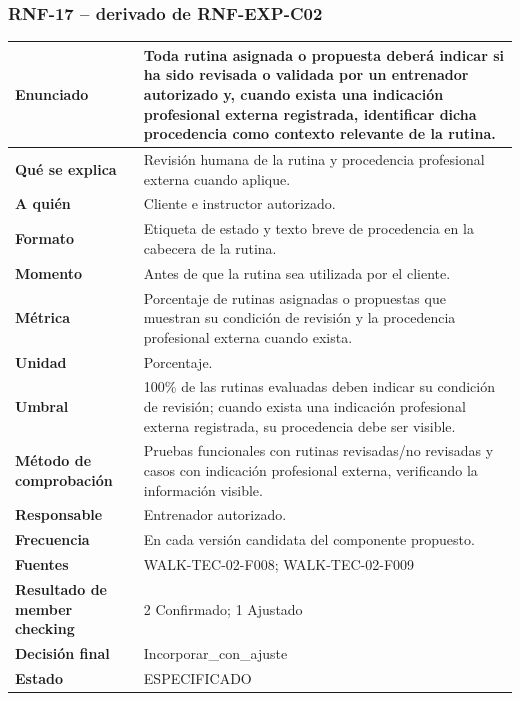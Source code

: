 \documentclass[11pt,a4paper,twoside]{article}
\begin{document}
\subsubsection{RNF-17 -- derivado de RNF-EXP-C02}
\begin{tabularx}{\textwidth}{|>{\bfseries}p{4.0cm}|X|}\hline
Enunciado & Toda rutina asignada o propuesta deberá indicar si ha sido revisada o validada por un entrenador autorizado y, cuando exista una indicación profesional externa registrada, identificar dicha procedencia como contexto relevante de la rutina. \\ \hline
Qué se explica & Revisión humana de la rutina y procedencia profesional externa cuando aplique. \\ \hline
A quién & Cliente e instructor autorizado. \\ \hline
Formato & Etiqueta de estado y texto breve de procedencia en la cabecera de la rutina. \\ \hline
Momento & Antes de que la rutina sea utilizada por el cliente. \\ \hline
Métrica & Porcentaje de rutinas asignadas o propuestas que muestran su condición de revisión y la procedencia profesional externa cuando exista. \\ \hline
Unidad & Porcentaje. \\ \hline
Umbral & 100\% de las rutinas evaluadas deben indicar su condición de revisión; cuando exista una indicación profesional externa registrada, su procedencia debe ser visible. \\ \hline
Método de comprobación & Pruebas funcionales con rutinas revisadas/no revisadas y casos con indicación profesional externa, verificando la información visible. \\ \hline
Responsable & Entrenador autorizado. \\ \hline
Frecuencia & En cada versión candidata del componente propuesto. \\ \hline
Fuentes & WALK-TEC-02-F008; WALK-TEC-02-F009 \\ \hline
Resultado de member checking & 2 Confirmado; 1 Ajustado \\ \hline
Decisión final & Incorporar\_con\_ajuste \\ \hline
Estado & ESPECIFICADO \\ \hline
\end{tabularx}
\end{document}
